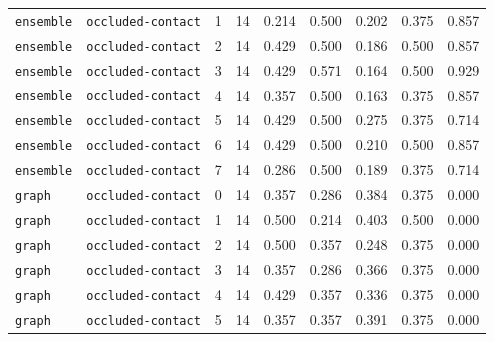 \documentclass{article}
\begin{document}
\begin{center}
\begin{tabular}{llccccccc}
\texttt{ensemble} & \texttt{occluded-contact} & 1 & 14 & 0.214 & 0.500 & 0.202 & 0.375 & 0.857 \\
\texttt{ensemble} & \texttt{occluded-contact} & 2 & 14 & 0.429 & 0.500 & 0.186 & 0.500 & 0.857 \\
\texttt{ensemble} & \texttt{occluded-contact} & 3 & 14 & 0.429 & 0.571 & 0.164 & 0.500 & 0.929 \\
\texttt{ensemble} & \texttt{occluded-contact} & 4 & 14 & 0.357 & 0.500 & 0.163 & 0.375 & 0.857 \\
\texttt{ensemble} & \texttt{occluded-contact} & 5 & 14 & 0.429 & 0.500 & 0.275 & 0.375 & 0.714 \\
\texttt{ensemble} & \texttt{occluded-contact} & 6 & 14 & 0.429 & 0.500 & 0.210 & 0.500 & 0.857 \\
\texttt{ensemble} & \texttt{occluded-contact} & 7 & 14 & 0.286 & 0.500 & 0.189 & 0.375 & 0.714 \\
\texttt{graph} & \texttt{occluded-contact} & 0 & 14 & 0.357 & 0.286 & 0.384 & 0.375 & 0.000 \\
\texttt{graph} & \texttt{occluded-contact} & 1 & 14 & 0.500 & 0.214 & 0.403 & 0.500 & 0.000 \\
\texttt{graph} & \texttt{occluded-contact} & 2 & 14 & 0.500 & 0.357 & 0.248 & 0.375 & 0.000 \\
\texttt{graph} & \texttt{occluded-contact} & 3 & 14 & 0.357 & 0.286 & 0.366 & 0.375 & 0.000 \\
\texttt{graph} & \texttt{occluded-contact} & 4 & 14 & 0.429 & 0.357 & 0.336 & 0.375 & 0.000 \\
\texttt{graph} & \texttt{occluded-contact} & 5 & 14 & 0.357 & 0.357 & 0.391 & 0.375 & 0.000 \\
\bottomrule
\end{tabular}
\end{center}
\end{document}
